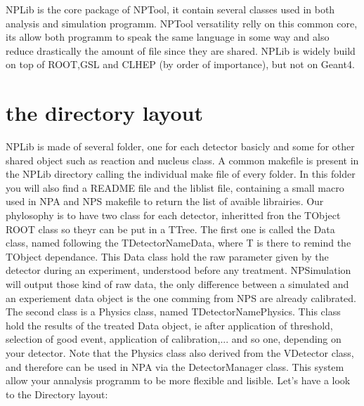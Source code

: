 \documentclass{book}
\begin{document}
	NPLib is the core package of NPTool, it contain several classes used in both analysis and simulation programm.
	NPTool versatility relly on this common core, its allow both programm to speak the same language in some way and also reduce drastically the amount of file since they are shared.
	NPLib is widely build on top of ROOT,GSL and CLHEP (by order of importance), but not on Geant4.
	
	\section{the directory layout}
		NPLib is made of several folder, one for each detector basicly and some for other shared object such as reaction and nucleus class. A common makefile is present in the NPLib directory calling the individual make file of every folder. In this folder you will also find a README file and the liblist file, containing a small macro used in NPA and NPS makefile to return the list of avaible librairies. Our phylosophy is to have two class for each detector, inheritted fron the TObject ROOT class so theyr can be put in a TTree. The first one is called the Data class, named following the TDetectorNameData, where T is there to remind the TObject dependance. This Data class hold the raw parameter given by the detector during an experiment, understood before any treatment. NPSimulation will output those kind of raw data, the only difference between a simulated and an experiement data object is the one comming from NPS are already calibrated. The second class is a Physics class, named TDetectorNamePhysics. This class hold the results of the treated Data object, ie after application of threshold, selection of good event, application of calibration,... and so one, depending on your detector. Note that the Physics class also derived from the VDetector class, and therefore can be used in NPA via the DetectorManager class. This system allow your annalysis programm to be more flexible and lisible. Let's have a look to the Directory layout:
		
\end{document}
